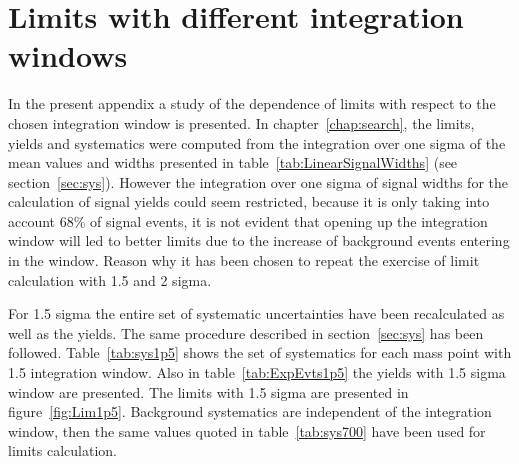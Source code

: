 \chapter{Limits with different integration windows}
\label{chap:windstudy}

In the present appendix a study of the dependence of limits with respect to the chosen integration window is presented. In chapter~\ref{chap:search}, the limits, yields and systematics were computed from the integration over one sigma of the mean values and widths presented in table~\ref{tab:LinearSignalWidths} (see section~\ref{sec:sys}). However the integration over one sigma of signal widths for the calculation of signal yields could seem restricted, because it is only taking into account 68\% of signal events, it is not evident that opening up the integration window will led to better limits due to the increase of background events entering in the window. Reason why it has been chosen to repeat the exercise of limit calculation with 1.5 and 2 sigma.

For 1.5 sigma the entire set of systematic uncertainties have been recalculated as well as the yields. The same procedure described in section~\ref{sec:sys} has been followed. Table~\ref{tab:sys1p5} shows the set of systematics for each mass point with 1.5 integration window. Also in table~\ref{tab:ExpEvts1p5} the yields with 1.5 sigma window are presented. The limits with 1.5 sigma are presented in figure~\ref{fig:Lim1p5}. Background systematics are independent of the integration window, then the same values quoted in table~\ref{tab:sys700} have been used for limits calculation.

